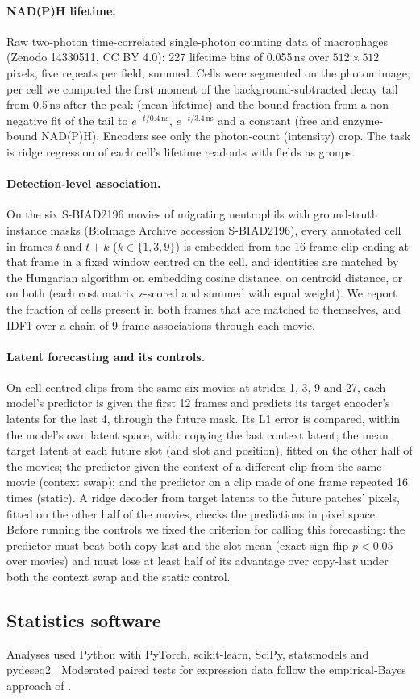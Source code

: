 \paragraph{NAD(P)H lifetime.}
Raw two-photon time-correlated single-photon counting data of macrophages
\citep{musimbi2025flim} (Zenodo 14330511, CC BY 4.0): 227 lifetime bins of 0.055\,ns over
$512\times512$ pixels, five repeats per field, summed. Cells were segmented on the photon
image; per cell we computed the first moment of the background-subtracted decay tail from
0.5\,ns after the peak (mean lifetime) and the bound fraction from a non-negative fit of the
tail to $e^{-t/0.4\,\mathrm{ns}}$, $e^{-t/3.4\,\mathrm{ns}}$ and a constant (free and
enzyme-bound NAD(P)H). Encoders see only the photon-count (intensity) crop. The task is
ridge regression of each cell's lifetime readouts with fields as groups.

\paragraph{Detection-level association.}
On the six S-BIAD2196 movies of migrating neutrophils with ground-truth instance masks
(BioImage Archive accession S-BIAD2196), every annotated cell in frames $t$ and $t+k$ ($k\in\{1,3,9\}$) is embedded
from the 16-frame clip ending at that frame in a fixed window centred on the cell, and
identities are matched by the Hungarian algorithm on embedding cosine distance, on
centroid distance, or on both (each cost matrix z-scored and summed with equal weight).
We report the fraction of cells present in both frames that are matched to themselves, and
IDF1 over a chain of 9-frame associations through each movie.

\paragraph{Latent forecasting and its controls.}
On cell-centred clips from the same six movies at strides 1, 3, 9 and 27, each model's
predictor is given the first 12 frames and predicts its target encoder's latents for the
last 4, through the future mask. Its L1 error is compared, within the model's own latent
space, with: copying the last context latent; the mean target latent at each future slot
(and slot and position), fitted on the other half of the movies; the predictor given the
context of a different clip from the same movie (context swap); and the predictor on a
clip made of one frame repeated 16 times (static). A ridge decoder from target latents to
the future patches' pixels, fitted on the other half of the movies, checks the predictions
in pixel space. Before running the controls we fixed the criterion for calling this
forecasting: the predictor must beat both copy-last and the slot mean (exact sign-flip
$p<0.05$ over movies) and must lose at least half of its advantage over copy-last under
both the context swap and the static control.

\subsection{Statistics software}
Analyses used Python with PyTorch, scikit-learn, SciPy, statsmodels and pydeseq2
\citep{pydeseq2}. Moderated paired tests for expression data follow the
empirical-Bayes approach of \citet{smyth2004}.
